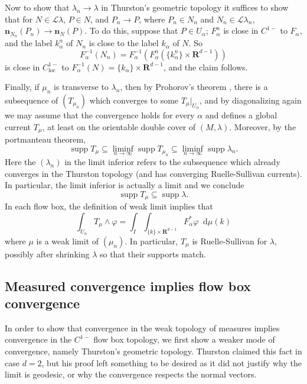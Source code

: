 \documentclass[reqno,11pt]{amsart}
\newcommand{\RR}{\mathbf{R}}
\newcommand*\dif{\mathop{}\!\mathrm{d}}
\DeclareMathOperator{\supp}{supp}
\newcommand{\Leaves}{\mathscr L}
\newcommand{\normal}{\mathbf n}
\newcommand{\loc}{\mathrm{loc}}
\theoremstyle{definition}
\numberwithin{equation}{section}
\begin{document}
Now to show that $\lambda_n \to \lambda$ in Thurston's geometric topology it suffices to show that for $N \in \Leaves \lambda$, $P \in N$, and $P_n \to P$, where $P_n \in N_n$ and $N_n \in \Leaves \lambda_n$, $\normal_{N_n}(P_n) \to \normal_N(P)$.
To do this, suppose that $P \in U_\alpha$; $F_\alpha^n$ is close in $C^{1-}$ to $F_\alpha$, and the label $k^n_\alpha$ of $N_n$ is close to the label $k_\alpha$ of $N$.
So
$$F_\alpha^{-1}(N_n) = F_\alpha^{-1}(F_\alpha^n(\{k_\alpha^n\} \times \RR^{d - 1}))$$
is close in $C^{1-}_\loc$ to $F_\alpha^{-1}(N) = \{k_\alpha\} \times \RR^{d - 1}$, and the claim follows.

Finally, if $\mu_n$ is transverse to $\lambda_n$, then by Prohorov's theorem \cite[Theorem 13.29]{klenke2013probability}, there is a subsequence of $(T_{\mu_n})$ which converges to some $T_\mu|_{U_\alpha}$, and by diagonalizing again we may assume that the convergence holds for every $\alpha$ and defines a global current $T_\mu$, at least on the orientable double cover of $(M, \lambda)$.
Moreover, by the portmanteau theorem,
$$\supp T_\mu \subseteq \liminf_{n \to \infty} \supp T_{\mu_n} \subseteq \liminf_{n \to \infty} \supp \lambda_n.$$
Here the $(\lambda_n)$ in the limit inferior refers to the subsequence which already converges in the Thurston topology (and has converging Ruelle-Sullivan currents).
In particular, the limit inferior is actually a limit and we conclude
$$\supp T_\mu \subseteq \supp \lambda.$$
In each flow box, the definition of weak limit implies that
$$\int_{U_\alpha} T_\mu \wedge \varphi = \int_I \int_{\{k\} \times \RR^{d - 1}} F_\alpha^* \varphi \dif \mu(k)$$
where $\mu$ is a weak limit of $(\mu_n)$.
In particular, $T_\mu$ is Ruelle-Sullivan for $\lambda$, possibly after shrinking $\lambda$ so that their supports match.

\subsection{Measured convergence implies flow box convergence}
In order to show that convergence in the weak topology of measures implies convergence in the $C^{1-}$ flow box topology, we first show a weaker mode of convergence, namely Thurston's geometric topology.
Thurston claimed this fact \cite[Proposition 8.10.3]{thurston1979geometry} in case $d = 2$, but his proof left something to be desired as it did not justify why the limit is geodesic, or why the convergence respects the normal vectors.
\end{document}
